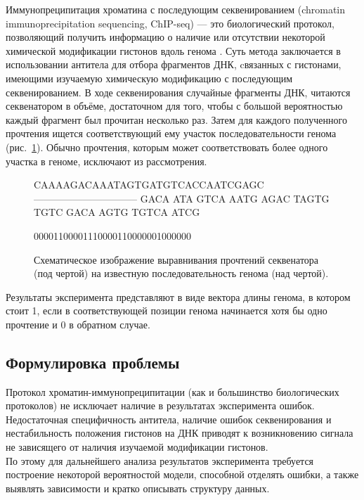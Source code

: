 \documentclass{matmex-diploma-custom}
\begin{document}

Иммунопреципитация хроматина с последующим секвенированием (chromatin
immunoprecipitation sequencing, ChIP-seq) --- это биологический протокол,
позволяющий получить информацию о наличие или отсутствии некоторой химической
модификации гистонов вдоль генома \cite{Johnson2007}. Суть метода заключается в
использовании антитела для отбора фрагментов ДНК, cвязанных с гистонами,
имеющими изучаемую химическую модификацию с последующим секвенированием. В ходе
секвенирования случайные фрагменты ДНК, читаются секвенатором в объёме,
достаточном для того, чтобы с большой вероятностью каждый фрагмент был прочитан
несколько раз. Затем для каждого полученного прочтения ищется соответствующий
ему участок последовательности генома (рис.~\ref{fig:chip-seq}). Обычно
прочтения, которым может соответствовать более одного участка в геноме,
исключают из рассмотрения.

\begin{figure}[h]
  \centering

          CAAAAGACAAATAGTGATGTCACCAATCGAGC
          --------------------------------
               GACA ATA     GTCA   AATG
              AGAC   TAGTG TGTC
               GACA   AGTG TGTCA   ATCG

          00001100001110000110000001000000
  \caption{Схематическое изображение выравнивания прочтений секвенатора (под чертой)
    на известную последовательность генома (над чертой).}
  \label{fig:chip-seq}
\end{figure}

Результаты эксперимента представляют в виде вектора длины генома, в котором
стоит 1, если в соответствующей позиции генома начинается хотя бы одно прочтение
и 0 в обратном случае.


\subsection*{Формулировка проблемы}
Протокол хроматин-иммунопреципитации (как и большинство биологических
протоколов) не исключает наличие в результатах эксперимента
ошибок. Недостаточная специфичность антитела, наличие ошибок секвенирования
и нестабильность положения гистонов на ДНК приводят к возникновению сигнала не
зависящего от наличия изучаемой модификации гистонов.
\\
По этому для дальнейшего анализа результатов эксперимента требуется построение некоторой вероятностой модели, способной отделять ошибки, а также выявлять зависимости и кратко описывать структуру данных.
\end{document}
